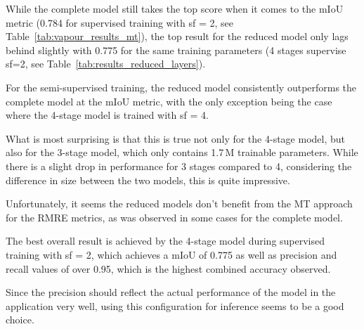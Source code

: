 While the complete model still takes the top score when it comes to the mIoU metric (0.784 for supervised training with sf = 2, see Table~\ref{tab:vapour_results_mt}), the top result for the reduced model only lags behind slightly with 0.775 for the same training parameters (4 stages supervise sf=2, see Table~\ref{tab:results_reduced_layers}).

For the semi-supervised training, the reduced model consistently outperforms the complete model at the mIoU metric, with the only exception being the case where the 4-stage model is trained with sf = 4. 

What is most surprising is that this is true not only for the 4-stage model, but also for the 3-stage model, which only contains 1.7\,M trainable parameters.
While there is a slight drop in performance for 3 stages compared to 4, considering the difference in size between the two models, this is quite impressive.

Unfortunately, it seems the reduced models don't benefit from the MT approach for the RMRE metrics, as was observed in some cases for the complete model.

The best overall result is achieved by the 4-stage model during supervised training with sf = 2, which achieves a mIoU of 0.775 as well as precision and recall values of over 0.95, which is the highest combined accuracy observed.

Since the precision should reflect the actual performance of the model in the application very well, using this configuration for inference seems to be a good choice.

